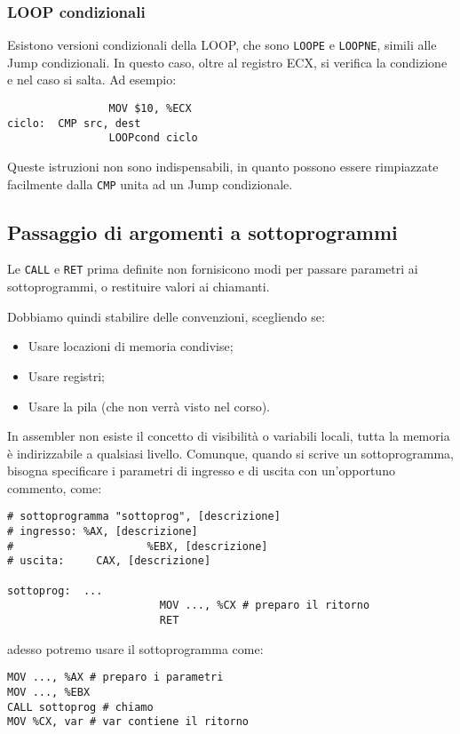 \documentclass[a4paper,11pt]{article}
\begin{document}
\subsubsection{LOOP condizionali}
Esistono versioni condizionali della LOOP, che sono \lstinline|LOOPE| e \lstinline|LOOPNE|, simili alle Jump condizionali. In questo caso, oltre al registro ECX, si verifica la condizione e nel caso si salta. Ad esempio:

\begin{lstlisting}	
				MOV $10, %ECX
ciclo: 	CMP src, dest
				LOOPcond ciclo
\end{lstlisting}

\par\smallskip
Queste istruzioni non sono indispensabili, in quanto possono essere rimpiazzate facilmente dalla \lstinline|CMP| unita ad un Jump condizionale.

\subsection{Passaggio di argomenti a sottoprogrammi}
Le \lstinline|CALL| e \lstinline|RET| prima definite non fornisicono modi per passare parametri ai sottoprogrammi, o restituire valori ai chiamanti.

Dobbiamo quindi stabilire delle convenzioni, scegliendo se:
\begin{itemize}
	\item Usare locazioni di memoria condivise;
	\item Usare registri;
	\item Usare la pila (che non verrà visto nel corso).
\end{itemize}

In assembler non esiste il concetto di visibilità o variabili locali, tutta la memoria è indirizzabile a qualsiasi livello.
Comunque, quando si scrive un sottoprogramma, bisogna specificare i parametri di ingresso e di uscita con un'opportuno commento, come:
\begin{lstlisting}	
# sottoprogramma "sottoprog", [descrizione]
# ingresso: %AX, [descrizione]
#					  %EBX, [descrizione]
# uscita:	  CAX, [descrizione]

sottoprog: 	...
						MOV ..., %CX # preparo il ritorno
						RET
\end{lstlisting} 

adesso potremo usare il sottoprogramma come:
\begin{lstlisting}	
MOV ..., %AX # preparo i parametri
MOV ..., %EBX
CALL sottoprog # chiamo
MOV %CX, var # var contiene il ritorno
\end{lstlisting}
\end{document}

